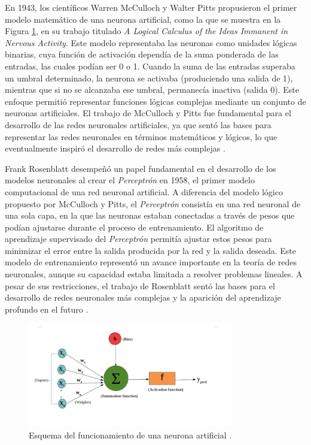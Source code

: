En 1943, los científicos Warren McCulloch y Walter Pitts propusieron el primer modelo matemático de una neurona artificial, como la que se muestra en la Figura \ref{fig:neu-art}, en su trabajo titulado \textit{A Logical Calculus of the Ideas Immanent in Nervous Activity}. Este modelo representaba las neuronas como unidades lógicas binarias, cuya función de activación dependía de la suma ponderada de las entradas, las cuales podían ser 0 o 1. Cuando la suma de las entradas superaba un umbral determinado, la neurona se activaba (produciendo una salida de 1), mientras que si no se alcanzaba ese umbral, permanecía inactiva (salida 0). Este enfoque permitió representar funciones lógicas complejas mediante un conjunto de neuronas artificiales. El trabajo de McCulloch y Pitts fue fundamental para el desarrollo de las redes neuronales artificiales, ya que sentó las bases para representar las redes neuronales en términos matemáticos y lógicos, lo que eventualmente inspiró el desarrollo de redes más complejas \cite{mcculloch1943logical}.


Frank Rosenblatt desempeñó un papel fundamental en el desarrollo de los modelos neuronales al crear el \textit{Perceptrón} en 1958, el primer modelo computacional de una red neuronal artificial. A diferencia del modelo lógico propuesto por McCulloch y Pitts, el \textit{Perceptrón} consistía en una red neuronal de una sola capa, en la que las neuronas estaban conectadas a través de pesos que podían ajustarse durante el proceso de entrenamiento. El algoritmo de aprendizaje supervisado del \textit{Perceptrón} permitía ajustar estos pesos para minimizar el error entre la salida producida por la red y la salida deseada. Este modelo de entrenamiento representó un avance importante en la teoría de redes neuronales, aunque su capacidad estaba limitada a resolver problemas lineales. A pesar de sus restricciones, el trabajo de Rosenblatt sentó las bases para el desarrollo de redes neuronales más complejas y la aparición del aprendizaje profundo en el futuro \cite{rosenblatt1958perceptron}.


\begin{figure}[H]
    \centering
    \includegraphics[width=0.8\textwidth]{./img/modelo/neuronaartificial.png}
    \caption{Esquema del funcionamiento de una neurona artificial \cite{tomorrow2023peso}.}
    \label{fig:neu-art}
\end{figure}

